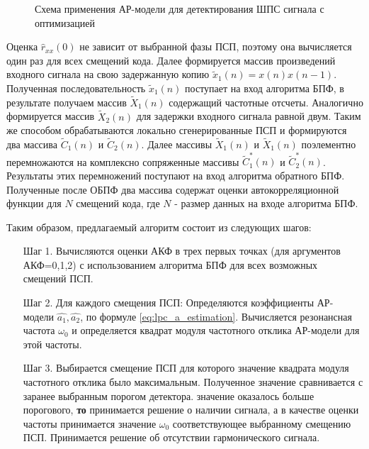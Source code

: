 \begin{figure}[h]
	\center{}
	\caption{Схема применения АР-модели для детектирования ШПС сигнала с оптимизацией}
	\label{pic:lpc_basic2}
\end{figure}

Оценка ${\hat{r}_{xx}(0)}$ не зависит от выбранной фазы ПСП, поэтому она вычисляется один
раз для всех смещений кода. Далее формируется массив произведений входного сигнала на
свою задержанную копию ${\tilde{x}_1(n)=x(n)x(n-1)}$. Полученная последовательность  
${\tilde{x}_1(n)}$ поступает на вход алгоритма БПФ, в результате получаем массив ${\tilde{X}_1(n)}$
содержащий частотные отсчеты. Аналогично формируется массив  ${\tilde{X}_2(n)}$ для
задержки входного сигнала равной двум. Таким же способом обрабатываются локально
сгенерированные ПСП и формируются два массива ${\tilde{C}_1(n)}$ и ${\tilde{C}_2(n)}$.
Далее массивы ${\tilde{X}_1(n)}$ и ${\tilde{X}_1(n)}$ поэлементно перемножаются
на комплексно сопряженные массивы ${\tilde{C}_1^*(n)}$ и ${\tilde{C}_2^*(n)}$.
Результаты этих перемножений поступают на вход алгоритма обратного
БПФ. Полученные после ОБПФ два массива содержат оценки автокорреляционной функции для ${N}$ 
смещений кода, где  ${N}$ - размер данных на входе алгоритма БПФ.

Таким образом, предлагаемый алгоритм состоит из следующих шагов:

\begin{itemize}[align=left,style=nextline,leftmargin=*,labelsep=\parindent,font=\normalfont]
\item[Шаг 1.] Вычисляются оценки  АКФ в трех первых точках (для аргументов АКФ=0,1,2)
	с использованием алгоритма БПФ для всех возможных смещений ПСП. 
\item[Шаг 2.] Для каждого смещения ПСП: 
	Определяются коэффициенты АР-модели ${\hat{a_1}, \hat{a_2}}$, 
	по формуле \ref{eq:lpc_a_estimation}. 
	Вычисляется резонансная частота ${\omega_0}$
	и определяется квадрат модуля частотного отклика АР-модели для этой частоты. 
\item[Шаг 3.] Выбирается смещение ПСП для которого значение квадрата модуля частотного отклика было максимальным. Полученное значение сравнивается с заранее выбранным порогом детектора. 
	  значение оказалось больше порогового, {\bf{то}} 
		принимается решение о наличии сигнала, а в качестве оценки
		частоты принимается значение ${\omega_0}$ соответствующее выбранному смещению ПСП. 
		Принимается решение об отсутствии гармонического сигнала.
\end{itemize}

